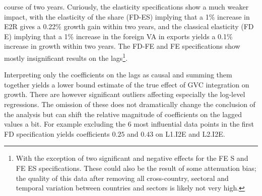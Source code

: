 \documentclass[a4paper]{article}
\begin{document}
\noindent course of two years. Curiously, the elasticity specifications show a much weaker impact, with the elasticity of the share (FD-ES) implying that a 1\% increase in E2R gives a 0.22\% growth gain within two years, and the classical elasticity (FD E) implying that a 1\% increase in the foreign VA in exports yields a 0.1\% increase in growth within two years. The FD-FE and FE specifications show mostly insignificant results on the lags\footnote{With the exception of two significant and negative effects for the FE S and FE ES specifications. These could also be the result of some attenuation bias; the quality of this data after removing all cross-country, sectoral and temporal variation between countries and sectors is likely not very high.}. \newline

 Interpreting only the coefficients on the lags as causal and summing them together yields a lower bound estimate of the true effect of GVC integration on growth. There are however significant outliers affecting especially the log-level regressions. The omission of these does not dramatically change the conclusion of the analysis but can shift the relative magnitude of coefficients on the lagged values a bit. For example excluding the 6 most influential data points in the first FD specification yields coefficients $0.25$ and $0.43$ on L1.I2E and L2.I2E. \newline 
\end{document}
